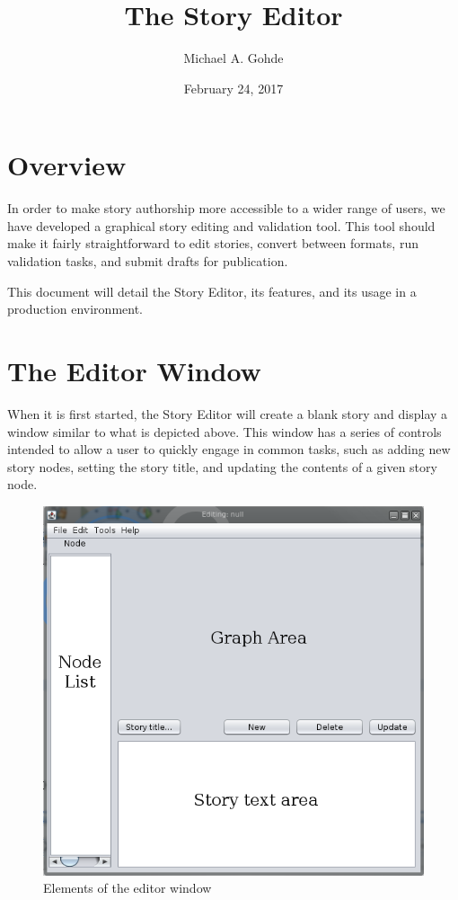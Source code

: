 \documentclass[12pt,letterpaper]{article}
\begin{document}
\title{The Story Editor}
\author{Michael A. Gohde}
\date{February 24, 2017}
\maketitle

\section{Overview}
In order to make story authorship more accessible to a wider range of users, we have developed a graphical story editing and validation tool.
This tool should make it fairly straightforward to edit stories, convert between formats, run validation tasks, and submit drafts for publication.

This document will detail the Story Editor, its features, and its usage in a production environment.

\section{The Editor Window}

When it is first started, the Story Editor will create a blank story and display a window similar to what is depicted above. 
This window has a series of controls intended to allow a user to quickly engage in common tasks, such as adding new story nodes, setting the story title, and updating the contents of a given story node.

\begin{figure}
    \begin{center}
        \includegraphics[scale=1]{emptywindow_with_labels.png}
    \end{center}
    \caption{Elements of the editor window}
\end{figure}
\end{document}
